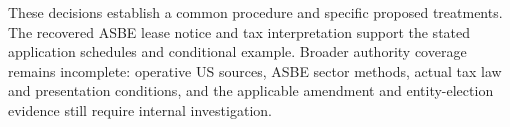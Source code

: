 These decisions establish a common procedure and specific proposed treatments. The recovered ASBE lease notice and tax interpretation support the stated application schedules and conditional example. Broader authority coverage remains incomplete: operative US sources, ASBE sector methods, actual tax law and presentation conditions, and the applicable amendment and entity-election evidence still require internal investigation.
